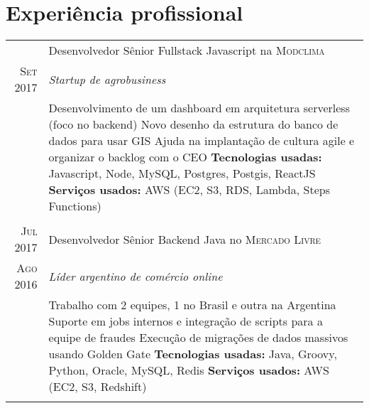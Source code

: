 \documentclass[a4paper,10pt]{article}
\begin{document}

\section{Experiência profissional}
\begin{tabular}{r|p{11cm}}

 \textsc{ } & Desenvolvedor Sênior Fullstack Javascript na \textsc{Modclima} \\\textsc{Set 2017}&\emph{Startup de agrobusiness }\\&\footnotesize{
  Desenvolvimento de um dashboard em arquitetura serverless (foco no backend)\newline
  Novo desenho da estrutura do banco de dados para usar GIS\newline
  Ajuda na implantação de cultura agile e organizar o backlog com o CEO\newline
\textbf{Tecnologias usadas:} Javascript, Node, MySQL, Postgres, Postgis, ReactJS\newline
\textbf{Serviços usados:} AWS (EC2, S3, RDS, Lambda, Steps Functions)}\\\multicolumn{2}{c}{} \\

 \textsc{Jul 2017} & Desenvolvedor Sênior Backend Java no \textsc{Mercado Livre} \\\textsc{Ago 2016}&\emph{Líder argentino de comércio online }\\&\footnotesize{
  Trabalho com 2 equipes, 1 no Brasil e outra na Argentina\newline
  Suporte em jobs internos e integração de scripts para a equipe de fraudes\newline
  Execução de migrações de dados massivos usando Golden Gate\newline
\textbf{Tecnologias usadas:} Java, Groovy, Python, Oracle, MySQL, Redis\newline
\textbf{Serviços usados:} AWS (EC2, S3, Redshift)}\\\multicolumn{2}{c}{} \\


\end{tabular}
\end{document}
